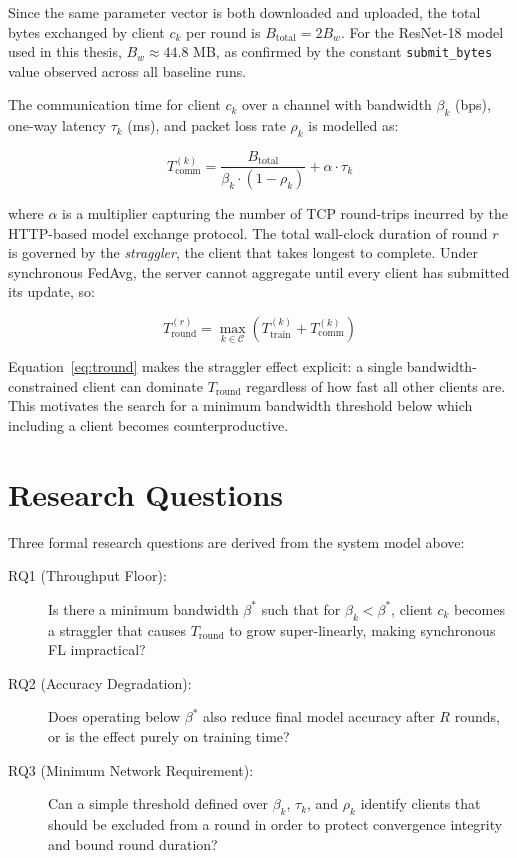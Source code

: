 \documentclass[12pt,a4paper]{report}
\begin{document}
Since the same parameter vector is both downloaded and uploaded, the total bytes
exchanged by client $c_k$ per round is $B_{\mathrm{total}} = 2 B_w$. For the
ResNet-18 model used in this thesis, $B_w \approx 44.8$ MB, as confirmed by the
constant \texttt{submit\_bytes} value observed across all baseline runs.

The communication time for client $c_k$ over a channel with bandwidth $\beta_k$
(bps), one-way latency $\tau_k$ (ms), and packet loss rate $\rho_k$ is modelled as:

\begin{equation}
  T_{\mathrm{comm}}^{(k)} =
  \frac{B_{\mathrm{total}}}{\beta_k \cdot (1 - \rho_k)} + \alpha \cdot \tau_k
  \label{eq:tcomm}
\end{equation}

where $\alpha$ is a multiplier capturing the number of TCP round-trips incurred by
the HTTP-based model exchange protocol. The total wall-clock duration of round $r$
is governed by the \emph{straggler}, the client that takes longest to complete.
Under synchronous FedAvg, the server cannot aggregate until every client has
submitted its update, so:

\begin{equation}
  T_{\mathrm{round}}^{(r)} = \max_{k \in \mathcal{C}}
  \left( T_{\mathrm{train}}^{(k)} + T_{\mathrm{comm}}^{(k)} \right)
  \label{eq:tround}
\end{equation}

Equation~\ref{eq:tround} makes the straggler effect explicit: a single
bandwidth-constrained client can dominate $T_{\mathrm{round}}$ regardless of how
fast all other clients are. This motivates the search for a minimum bandwidth
threshold below which including a client becomes counterproductive.

\section{Research Questions}

Three formal research questions are derived from the system model above:

\begin{description}
  \item[RQ1 (Throughput Floor):] Is there a minimum bandwidth $\beta^*$ such that
  for $\beta_k < \beta^*$, client $c_k$ becomes a straggler that causes
  $T_{\mathrm{round}}$ to grow super-linearly, making synchronous FL impractical?

  \item[RQ2 (Accuracy Degradation):] Does operating below $\beta^*$ also reduce
  final model accuracy after $R$ rounds, or is the effect purely on training time?

  \item[RQ3 (Minimum Network Requirement):] Can a simple threshold defined over
  $\beta_k$, $\tau_k$, and $\rho_k$ identify clients that should be excluded from
  a round in order to protect convergence integrity and bound round duration?
\end{description}
\end{document}
